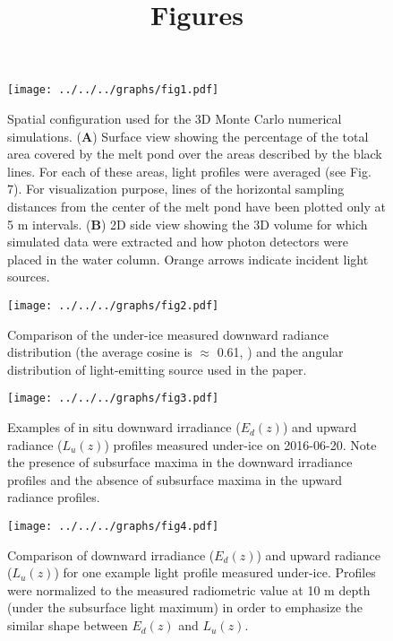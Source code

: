 \documentclass[12pt,a4paper]{scrartcl}
\title{Figures}
\date{}
\newcommand{\edz}{\ensuremath{{E_d(z)}}}
\newcommand{\luz}{\ensuremath{{L_u(z)}}}
\begin{document}
\maketitle

\begin{figure}[ht]
	\centering
	\texttt{[image: ../../../graphs/fig1.pdf]}
	\caption{Spatial configuration used for the 3D Monte Carlo numerical simulations. (\textbf{A}) Surface view showing the percentage of the total area covered by the melt pond over the areas described by the black lines. For each of these areas, light profiles were averaged (see Fig. 7). For visualization purpose, lines of the horizontal sampling distances from the center of the melt pond have been plotted only at 5 m intervals. (\textbf{B}) 2D side view showing the 3D volume for which simulated data were extracted and how photon detectors were placed in the water column. Orange arrows indicate incident light sources.}
\end{figure}

\clearpage
\newpage

\begin{figure}[h]
	\centering
	\texttt{[image: ../../../graphs/fig2.pdf]}
	\caption{Comparison of the under-ice measured downward radiance distribution (the average cosine is $\approx$ 0.61, \cite{Girard2018}) and the angular distribution of light-emitting source used in the paper.}
\end{figure}

\clearpage
\newpage

\begin{figure}[ht]
	\centering
	\texttt{[image: ../../../graphs/fig3.pdf]}
	\caption{Examples of in situ downward irradiance (\edz{}) and upward radiance (\luz{}) profiles measured under-ice on 2016-06-20. Note the presence of subsurface maxima in the downward irradiance profiles and the absence of subsurface maxima in the upward radiance profiles.}
\end{figure}

\clearpage
\newpage

\begin{figure}[ht]
	\centering
	\texttt{[image: ../../../graphs/fig4.pdf]}
	\caption{Comparison of downward irradiance (\edz{}) and upward radiance (\luz{}) for one example light profile measured under-ice. Profiles were normalized to the measured radiometric value at 10 m depth (under the subsurface light maximum) in order to emphasize the similar shape between \edz{} and \luz{}.}
\end{figure}
\end{document}
